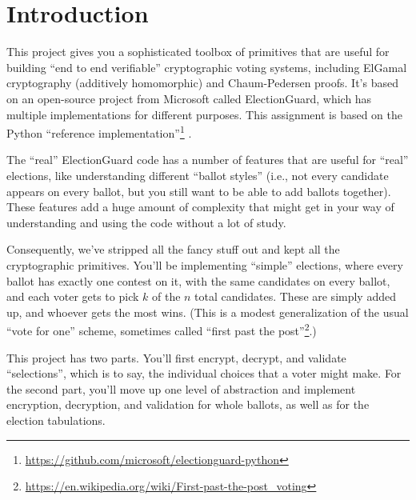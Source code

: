 

\handout
\setlength{\parindent}{0pt}
\problemsetheader
\setlength{\parindent}{20pt}

\tableofcontents

\vspace*{-15pt}
\section{Introduction}

This project gives you a sophisticated toolbox of primitives that are
useful for building ``end to end verifiable'' cryptographic voting systems,
including ElGamal cryptography (additively homomorphic) and
Chaum-Pedersen proofs. It's based on an open-source project from
Microsoft called ElectionGuard, which has multiple implementations
for different purposes. This assignment is based on the Python
``reference implementation''\footnote{\url{https://github.com/microsoft/electionguard-python}}
.

The ``real'' ElectionGuard code has a number of features that are
useful for ``real'' elections, like understanding different ``ballot
styles'' (i.e., not every candidate appears on every ballot, but you
still want to be able to add ballots together). These features add
a huge amount of complexity that might get in your way of
understanding and using the code without a lot of study.

Consequently, we've stripped all the fancy stuff out and kept all the
cryptographic primitives. You'll be implementing ``simple'' elections,
where every ballot has exactly one contest on it, with the same
candidates on every ballot, and each voter gets to pick $k$ of the $n$
total candidates. These are simply added up, and whoever gets the
most wins.
(This is a modest generalization of the usual ``vote for one''
scheme, sometimes called ``first past the
post''\footnote{\url{https://en.wikipedia.org/wiki/First-past-the-post_voting}}.)

This project has two parts. You'll first encrypt, decrypt, and
validate ``selections'', which is to say, the individual choices that
a voter might make. For the second part, you'll move up one level of
abstraction and implement encryption, decryption, and validation for
whole ballots, as well as for the election tabulations.

